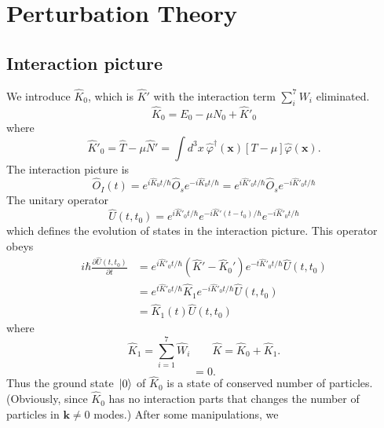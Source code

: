 \documentclass[12pt]{article}
\begin{document}
\section{Perturbation Theory}
\subsection*{Interaction picture}
We introduce $\hat{K}_0$, which is $\hat{K}'$ with the interaction term 
$\sum_{i}^7W_i$ eliminated.
\begin{equation}
    \hat{K}_0=E_0-\mu N_0+\hat{K}'_0
\end{equation}
where
\begin{equation}
    \hat{K}'_0=\hat{T}-\mu\hat{N}'=\int d^3x\ \hat{\varphi}^\dagger(\mathbf{x})[T-\mu]
    \hat{\varphi}(\mathbf{x}).
\end{equation}
The interaction picture is 
\begin{equation}
    \hat{O}_I(t)=e^{i\hat{K}_0t/\hbar}\hat{O}_se^{-i\hat{K}_0t/\hbar}=
    e^{i\hat{K}'_0t/\hbar}\hat{O}_se^{-i\hat{K}'_0t/\hbar}
\end{equation}
The unitary operator 
\begin{equation}
    \hat{U}(t,t_0)=e^{i\hat{K}'_0t/\hbar}e^{-i\hat{K}'(t-t_0)/\hbar}e^{-i\hat{K}'_0
    t/\hbar}
\end{equation}
which defines the evolution of states in the interaction picture. This operator obeys 
\begin{equation}
    \begin{aligned}
        i \hbar \frac{\partial \hat{U}(t,t_0)}{\partial t}&=e^{i\hat{K}'_0t/\hbar}
        \left(\hat{K}'-\hat{K}_0'\right)e^{-t \hat{K}'_0t/\hbar}\hat{U}(t,t_0)\\
        &=e^{t\hat{K}'_0t/\hbar}\hat{K}_1e^{-i\hat{K}'_0t/\hbar}\hat{U}(t,t_0) \\
        &=\hat{K}_1(t)\hat{U}(t,t_0)
        \end{aligned}
\end{equation}
where 
\begin{equation}
    \hat{K}_1=\sum_{i=1}^7\hat{W}_i\qquad\hat{K}=\hat{K}_0+\hat{K}_1.
\end{equation}
\begin{equation}
    [\hat{K}_0,\hat{N}]=0.
\end{equation}
Thus the ground state $\ket*{0}$ of $\hat{K}_0$ is a state of conserved number of 
particles. (Obviously, since $\hat{K}_0$ has no interaction parts that changes the 
number of particles in $\mathbf{k}\neq0$ modes.) After some manipulations, we 
\end{document}
